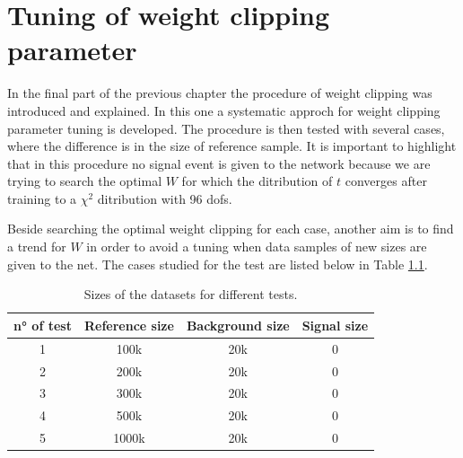 \chapter{Tuning of weight clipping parameter}

In the final part of the previous chapter the procedure of weight clipping was introduced and explained. In this one a systematic approch for weight clipping parameter tuning is developed. The procedure is then tested with several cases, where the difference is in the size of reference sample. It is important to highlight that in this procedure no signal event is given to the network because we are trying to search the optimal $W$ for which the ditribution of $t$ converges after training to a $\chi^2$ ditribution with 96 dofs.

Beside searching the optimal weight clipping for each case, another aim is to find a trend for $W$ in order to avoid a tuning when data samples of new sizes are given to the net. The cases studied for the test are listed below in Table \ref{tab:W_CLIP_TEST_SIZES}.

\begin{table}[H]
	\centering
	\begin{tabular}{c c c c}
		\toprule
		n° of test	&	Reference size	&	Background size	&	Signal size	\\
		\midrule
		1			&	100k			&	20k				&	0			\\
		2			&	200k			&	20k				&	0			\\
		3			&	300k			&	20k				&	0			\\
		4			&	500k			&	20k				&	0			\\
		5			&	1000k			&	20k				&	0			\\
		\bottomrule
	\end{tabular}
	\caption{Sizes of the datasets for different tests.}
	\label{tab:W_CLIP_TEST_SIZES}
\end{table}





